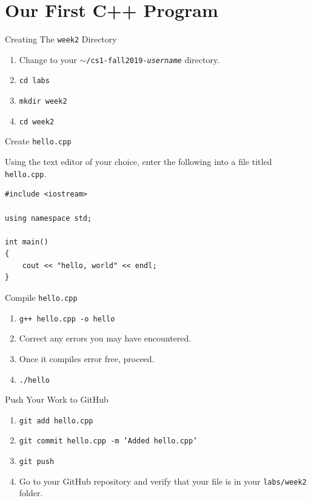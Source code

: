 \documentclass{beamer}
\begin{document}
\section{Our First C++ Program}
\begin{frame}{Creating The {\tt week2} Directory}
    \begin{enumerate}[<+->]
        \item Change to your {\tt $\sim$/cs1-fall2019-{\em username}}
            directory.
        \item {\tt cd labs}
        \item {\tt mkdir week2}
        \item {\tt cd week2}
    \end{enumerate}
\end{frame}

\begin{frame}[fragile]{Create {\tt hello.cpp}}

Using the text editor of your choice, enter the following into a file
titled {\tt hello.cpp}.

\begin{verbatim}
#include <iostream>

using namespace std;

int main()
{
    cout << "hello, world" << endl;
}
\end{verbatim}
\end{frame}

\begin{frame}{Compile {\tt hello.cpp}}
\begin{enumerate}[<+->]
    \item {\tt g++ hello.cpp -o hello}
    \item Correct any errors you may have encountered.
    \item Once it compiles error free, proceed.
    \item {\tt ./hello}
\end{enumerate}
\end{frame}

\begin{frame}{Push Your Work to GitHub}
\begin{enumerate}[<+->]
    \item {\tt git add hello.cpp}
    \item {\tt git commit hello.cpp -m 'Added hello.cpp'}
    \item {\tt git push}
    \item Go to your GitHub repository and verify that your file is in
    your {\tt labs/week2} folder.
\end{enumerate}
\end{frame}
\end{document}
